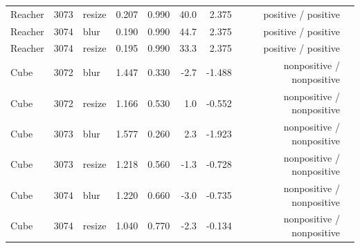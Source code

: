 \begin{table}[t]
\begin{tabular}{lrlrrrrrl}
Reacher & 3073 & resize & 0.207 & 0.990 & 40.0 & 2.375 & positive / positive \\
Reacher & 3074 & blur & 0.190 & 0.990 & 44.7 & 2.375 & positive / positive \\
Reacher & 3074 & resize & 0.195 & 0.990 & 33.3 & 2.375 & positive / positive \\
Cube & 3072 & blur & 1.447 & 0.330 & -2.7 & -1.488 & nonpositive / nonpositive \\
Cube & 3072 & resize & 1.166 & 0.530 & 1.0 & -0.552 & nonpositive / nonpositive \\
Cube & 3073 & blur & 1.577 & 0.260 & 2.3 & -1.923 & nonpositive / nonpositive \\
Cube & 3073 & resize & 1.218 & 0.560 & -1.3 & -0.728 & nonpositive / nonpositive \\
Cube & 3074 & blur & 1.220 & 0.660 & -3.0 & -0.735 & nonpositive / nonpositive \\
Cube & 3074 & resize & 1.040 & 0.770 & -2.3 & -0.134 & nonpositive / nonpositive \\
\bottomrule
\end{tabular}
\end{table}
